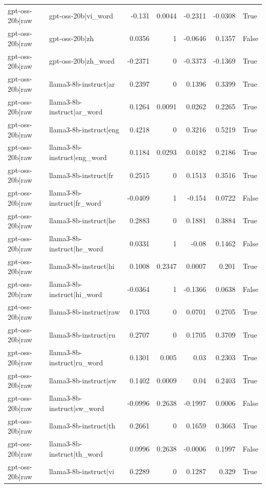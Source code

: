 \begin{table}
\begin{tabular}{l l r r r r l}
gpt-oss-20b|raw & gpt-oss-20b|vi_word & -0.131 & 0.0044 & -0.2311 & -0.0308 & True \\
gpt-oss-20b|raw & gpt-oss-20b|zh & 0.0356 & 1 & -0.0646 & 0.1357 & False \\
gpt-oss-20b|raw & gpt-oss-20b|zh_word & -0.2371 & 0 & -0.3373 & -0.1369 & True \\
gpt-oss-20b|raw & llama3-8b-instruct|ar & 0.2397 & 0 & 0.1396 & 0.3399 & True \\
gpt-oss-20b|raw & llama3-8b-instruct|ar_word & 0.1264 & 0.0091 & 0.0262 & 0.2265 & True \\
gpt-oss-20b|raw & llama3-8b-instruct|eng & 0.4218 & 0 & 0.3216 & 0.5219 & True \\
gpt-oss-20b|raw & llama3-8b-instruct|eng_word & 0.1184 & 0.0293 & 0.0182 & 0.2186 & True \\
gpt-oss-20b|raw & llama3-8b-instruct|fr & 0.2515 & 0 & 0.1513 & 0.3516 & True \\
gpt-oss-20b|raw & llama3-8b-instruct|fr_word & -0.0409 & 1 & -0.154 & 0.0722 & False \\
gpt-oss-20b|raw & llama3-8b-instruct|he & 0.2883 & 0 & 0.1881 & 0.3884 & True \\
gpt-oss-20b|raw & llama3-8b-instruct|he_word & 0.0331 & 1 & -0.08 & 0.1462 & False \\
gpt-oss-20b|raw & llama3-8b-instruct|hi & 0.1008 & 0.2347 & 0.0007 & 0.201 & True \\
gpt-oss-20b|raw & llama3-8b-instruct|hi_word & -0.0364 & 1 & -0.1366 & 0.0638 & False \\
gpt-oss-20b|raw & llama3-8b-instruct|raw & 0.1703 & 0 & 0.0701 & 0.2705 & True \\
gpt-oss-20b|raw & llama3-8b-instruct|ru & 0.2707 & 0 & 0.1705 & 0.3709 & True \\
gpt-oss-20b|raw & llama3-8b-instruct|ru_word & 0.1301 & 0.005 & 0.03 & 0.2303 & True \\
gpt-oss-20b|raw & llama3-8b-instruct|sw & 0.1402 & 0.0009 & 0.04 & 0.2403 & True \\
gpt-oss-20b|raw & llama3-8b-instruct|sw_word & -0.0996 & 0.2638 & -0.1997 & 0.0006 & False \\
gpt-oss-20b|raw & llama3-8b-instruct|th & 0.2661 & 0 & 0.1659 & 0.3663 & True \\
gpt-oss-20b|raw & llama3-8b-instruct|th_word & 0.0996 & 0.2638 & -0.0006 & 0.1997 & False \\
gpt-oss-20b|raw & llama3-8b-instruct|vi & 0.2289 & 0 & 0.1287 & 0.329 & True \\

\end{tabular}
\end{table}
